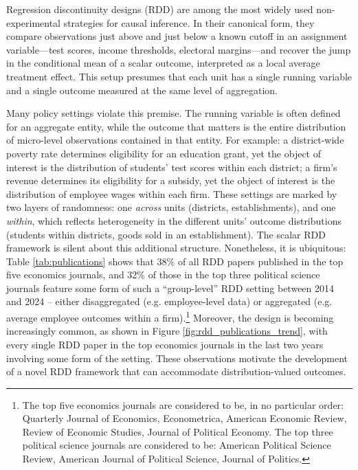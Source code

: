 \documentclass[12pt]{article}
\begin{document}
Regression discontinuity designs (RDD) are among the most widely used non-experimental strategies for causal inference. In their canonical form, they compare observations just above and just below a known cutoff in an assignment variable---test scores, income thresholds, electoral margins---and recover the jump in the conditional mean of a scalar outcome, interpreted as a local average treatment effect. This setup presumes that each unit has a single running variable and a single outcome measured at the same level of aggregation.

Many policy settings violate this premise. The running variable is often defined for an aggregate entity, while the outcome that matters is the entire distribution of micro-level observations contained in that entity. For example: a district-wide poverty rate determines eligibility for an education grant, yet the object of interest is the distribution of students’ test scores within each district; a firm's revenue determines its eligibility for a subsidy, yet the object of interest is the distribution of employee wages within each firm. These settings are marked by two layers of randomness: one \textit{across} units (districts, establishments), and one \textit{within}, which reflects heterogeneity in the different units' outcome distributions (students within districts, goods sold in an establishment). The scalar RDD framework is silent about this additional structure. Nonetheless, it is ubiquitous: Table \ref{tab:publications} shows that 38\% of all RDD papers published in the top five economics journals, and 32\% of those in the top three political science journals feature some form of such a ``group-level'' RDD setting between 2014 and 2024 -- either disaggregated (e.g. employee-level data) or aggregated (e.g. average employee outcomes within a firm).\footnote{The top five economics journals are considered to be, in no particular order: Quarterly Journal of Economics, Econometrica, American Economic Review, Review of Economic Studies, Journal of Political Economy. The top three political science journals are considered to be: American Political Science Review, American Journal of Political Science, Journal of Politics.} Moreover, the design is becoming increasingly common, as shown in Figure \ref{fig:rdd_publications_trend}, with every single RDD paper in the top economics journals in the last two years involving some form of the setting. These observations motivate the development of a novel RDD framework that can accommodate distribution-valued outcomes.
\end{document}
